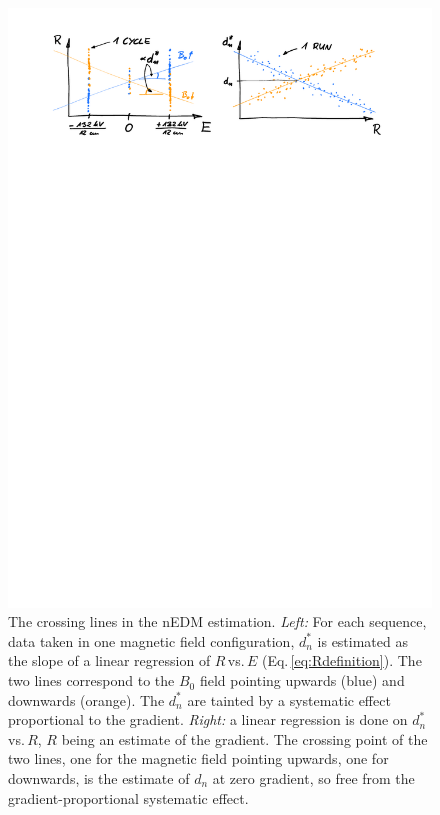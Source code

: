 \begin{figure}
  \centering
  \includegraphics[width=\linewidth]{gfx/nEDMatPSI/crossing_lines.pdf}
  \caption{The crossing lines in the nEDM estimation.
  \emph{Left:} For each sequence, data taken in one magnetic field configuration, $d_n^*$ is estimated as the slope of a linear regression of $R$\,vs.\,$E$ (Eq.\,\ref{eq:Rdefinition}).
  The two lines correspond to the $B_0$ field pointing upwards (blue) and downwards (orange).
  The $d_n^*$ are tainted by a systematic effect proportional to the gradient.
  \emph{Right:} a linear regression is done on $d_n^*$\,vs.\,$R$, $R$ being an estimate of the gradient.
  The crossing point of the two lines, one for the magnetic field pointing upwards, one for downwards, is the estimate of $d_n$ at zero gradient, so free from the gradient-proportional systematic effect.}\label{fig:crossing_lines}
\end{figure}

